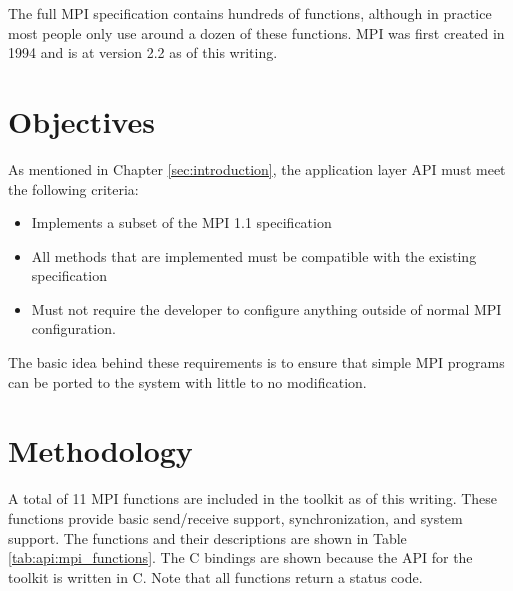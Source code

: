 The full MPI specification contains hundreds of functions, although in practice most people only use around a dozen of these functions. MPI was first created in 1994 and is at version 2.2 as of this writing.

\section{Objectives}\label{sec:api:objectives}

As mentioned in Chapter \ref{sec:introduction}, the application layer API must meet the following criteria: 
\begin{itemize}
	\item Implements a subset of the MPI 1.1 specification
	\item All methods that are implemented must be compatible with the existing specification
	\item Must not require the developer to configure anything outside of normal MPI configuration.
\end{itemize}
The basic idea behind these requirements is to ensure that simple MPI programs can be ported to the system with little to no modification.

\section{Methodology}\label{sec:api:methodology}

A total of 11 MPI functions are included in the toolkit as of this writing. These functions provide basic send/receive support, synchronization, and system support. The functions and their descriptions are shown in Table \ref{tab:api:mpi_functions}. The C bindings are shown because the API for the toolkit is written in C. Note that all functions return a status code.

